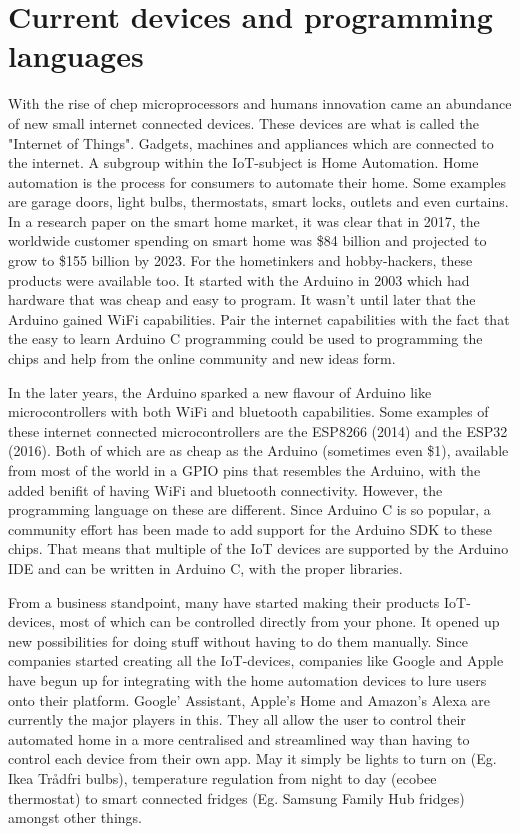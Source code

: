 \section{Current devices and programming languages}

With the rise of chep microprocessors and humans innovation came an abundance of new small internet connected devices. These devices are what is called the "Internet of Things". Gadgets, machines and appliances which are connected to the internet\cite{iot-definition}. A subgroup within the IoT-subject is Home Automation. Home automation is the process for consumers to automate their home. Some examples are garage doors, light bulbs, thermostats, smart locks, outlets and even curtains. In a research paper\cite{home-auto-growth} on the smart home market, it was clear that in 2017, the worldwide customer spending on smart home was \$84 billion and projected to grow to \$155 billion by 2023. For the hometinkers and hobby-hackers, these products were available too. It started with the Arduino in 2003 which had hardware that was cheap and easy to program\cite{arduino-history}. It wasn't until later that the Arduino gained WiFi capabilities. Pair the internet capabilities with the fact that the easy to learn Arduino C programming could be used to programming the chips and help from the online community and new ideas form. 

In the later years, the Arduino sparked a new flavour of Arduino like microcontrollers with both WiFi and bluetooth capabilities. Some examples of these internet connected microcontrollers are the ESP8266 (2014) and the ESP32 (2016). Both of which are as cheap as the Arduino (sometimes even \$1), available from most of the world in a GPIO pins that resembles the Arduino, with the added benifit of having WiFi and bluetooth connectivity. However, the programming language on these are different. Since Arduino C is so popular, a community effort has been made to add support for the Arduino SDK to these chips. That means that multiple of the IoT devices are supported by the Arduino IDE and can be written in Arduino C, with the proper libraries.

From a business standpoint, many have started making their products IoT-devices, most of which can be controlled directly from your phone. It opened up new possibilities for doing stuff without having to do them manually. Since companies started creating all the IoT-devices, companies like Google and Apple have begun up for integrating with the home automation devices to lure users onto their platform. Google' Assistant\cite{google-assistant}, Apple's Home\cite{apple-homekit} and Amazon's Alexa\cite{amazon-alexa} are currently the major players in this. They all allow the user to control their automated home in a more centralised and streamlined way than having to control each device from their own app. May it simply be lights to turn on (Eg. Ikea Trådfri bulbs), temperature regulation from night to day (ecobee thermostat) to smart connected fridges (Eg. Samsung Family Hub fridges) amongst other things. 